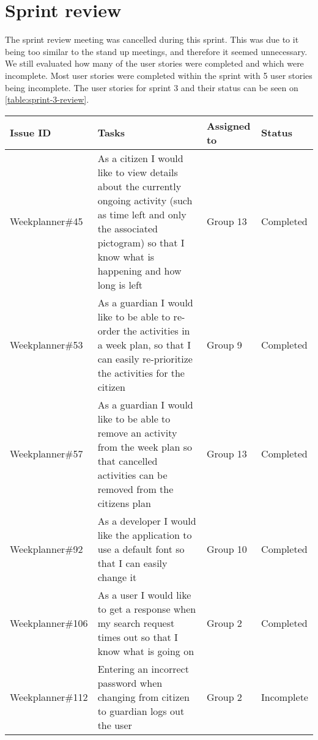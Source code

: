 \section{Sprint review}
The sprint review meeting was cancelled during this sprint. 
This was due to it being too similar to the stand up meetings, and therefore it seemed unnecessary. 
We still evaluated how many of the user stories were completed and which were incomplete.
Most user stories were completed within the sprint with 5 user stories being incomplete.    
The user stories for sprint 3 and their status can be seen on \autoref{table:sprint-3-review}.
\begin{longtable}{|p{2.9cm}|p{7cm}|p{2cm}|p{2cm}|}
    \hline
    Issue ID        & Tasks                                                                                                                                                                                    & Assigned to  & Status   \\ \hline
    Weekplanner\#45 & As a citizen I would like to view details about the currently ongoing activity (such as time left and only the associated pictogram) so that I know what is happening and how long is left & Group 13   & Completed         \\ \hline
    Weekplanner\#53 & As a guardian I would like to be able to re-order the activities in a week plan, so that I can easily re-prioritize the activities for the citizen                                      & Group 9       & Completed         \\ \hline
    Weekplanner\#57 & As a guardian I would like to be able to remove an activity from the week plan so that cancelled activities can be removed from the citizens plan                                    & Group 13         & Completed         \\ \hline
    Weekplanner\#92 & As a developer I would like the application to use a default font so that I can easily change it                                                                                       & Group 10       & Completed     \\ \hline
    Weekplanner\#106 & As a user I would like to get a response when my search request times out so that I know what is going on                                                                             & Group 2        & Completed    \\ \hline
    Weekplanner\#112 & Entering an incorrect password when changing from citizen to guardian logs out the user                                                                                                  & Group 2     & Incomplete    \\ \hline

\end{longtable}
